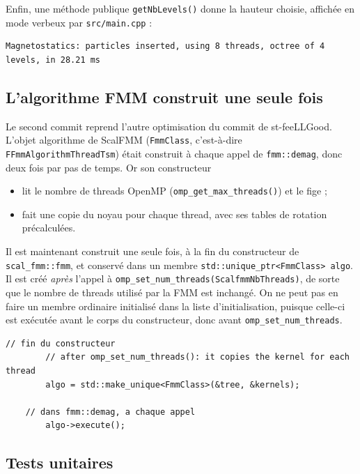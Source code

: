 \documentclass[11pt,a4paper]{article}
\newcommand{\code}[1]{\texttt{#1}}
\begin{document}
Enfin, une méthode publique \code{getNbLevels()} donne la hauteur choisie, affichée en mode
verbeux par \code{src/main.cpp} :
\begin{lstlisting}[language={},numbers=none,frame=none,basicstyle=\ttfamily\footnotesize]
Magnetostatics: particles inserted, using 8 threads, octree of 4 levels, in 28.21 ms
\end{lstlisting}

\subsection{L'algorithme FMM construit une seule fois}

Le second commit reprend l'autre optimisation du commit de st-feeLLGood. L'objet algorithme de
ScalFMM (\code{FmmClass}, c'est-à-dire \code{FFmmAlgorithmThreadTsm}) était construit à chaque
appel de \code{fmm::demag}, donc deux fois par pas de temps. Or son constructeur
\begin{itemize}
  \item lit le nombre de threads OpenMP (\code{omp\_get\_max\_threads()}) et le fige ;
  \item fait une copie du noyau pour chaque thread, avec ses tables de rotation précalculées.
\end{itemize}
Il est maintenant construit une seule fois, à la fin du constructeur de \code{scal\_fmm::fmm},
et conservé dans un membre \code{std::unique\_ptr<FmmClass> algo}. Il est créé \emph{après}
l'appel à \code{omp\_set\_num\_threads(ScalfmmNbThreads)}, de sorte que le nombre de threads
utilisé par la FMM est inchangé. On ne peut pas en faire un membre ordinaire initialisé dans la
liste d'initialisation, puisque celle-ci est exécutée avant le corps du constructeur, donc avant
\code{omp\_set\_num\_threads}.

\begin{lstlisting}[caption={Construction unique de l'algorithme (\code{src/fmm\_demag.h}).}]
        // fin du constructeur
        // after omp_set_num_threads(): it copies the kernel for each thread
        algo = std::make_unique<FmmClass>(&tree, &kernels);

    // dans fmm::demag, a chaque appel
        algo->execute();
\end{lstlisting}

\subsection{Tests unitaires}
\end{document}

